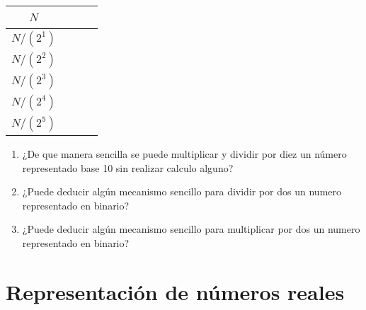 \documentclass[12pt]{article}
\begin{document}
\begin{enumerate}
\begin{center}
\begin{tabular}[t]{|c|c|c|}
            \hline

                $N$ & \hspace{9em}~ &\hspace{9em}~\\

            \hline

                $N/(2^1)$ & ~ &~\\

            \hline

                $N/(2^2)$ & ~ &~\\

            \hline

                $N/(2^3)$ & ~ &~\\

            \hline

                $N/(2^4)$ & ~ &~\\

            \hline

                $N/(2^5)$ & ~ &~\\

            \hline

            \end{tabular}

        \end{center}

        \begin{enumerate}

            \item ¿De que manera sencilla se puede multiplicar y dividir por diez un
                número representado base 10 sin realizar calculo alguno?

            \item ¿Puede deducir algún mecanismo sencillo para dividir por dos un
                numero representado en binario?

            \item ¿Puede deducir algún mecanismo sencillo para multiplicar por dos un
                numero representado en binario?

        \end{enumerate}

\end{enumerate}

\section{Representación de números reales}
\end{document}
